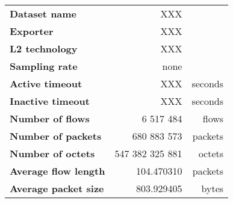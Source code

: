 \begin{tabular}{@{}lrr@{}}
\toprule
\textbf{Dataset name} & XXX & \\
\textbf{Exporter} & XXX & \\
\textbf{L2 technology} & XXX & \\
\textbf{Sampling rate} & none & \\
\textbf{Active timeout} & XXX & seconds \\
\textbf{Inactive timeout} & XXX & seconds \\
\midrule
\textbf{Number of flows} & 6 517 484 & flows \\
\textbf{Number of packets} & 680 883 573 & packets \\
\textbf{Number of octets} & 547 382 325 881 & octets \\
\textbf{Average flow length} & 104.470310 & packets \\
\textbf{Average packet size} & 803.929405 & bytes \\
\bottomrule
\end{tabular}


